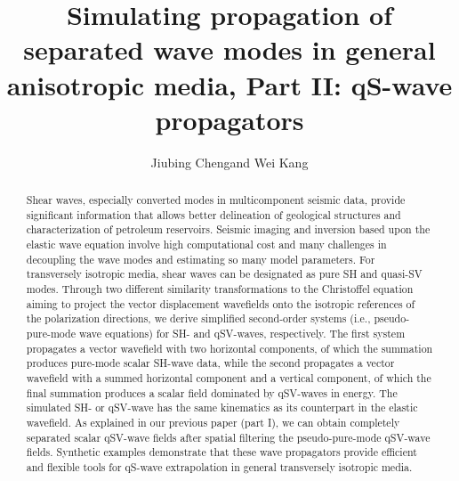 
\title{Simulating propagation of separated wave modes in general anisotropic media,
Part II: qS-wave propagators}

\author{Jiubing Cheng\footnotemark[1] and Wei Kang\footnotemark[2]}

\address{
\footnotemark[1] State Key Laboratory of Marine Geology,\\
Tongji University, Shanghai, China. E-mail: cjb1206@tongji.edu.cn\\
\footnotemark[2] Formerly Tongji University, Shanghai, China;\\
presently Schlumberger, Houston, Texas, USA. E-mail: wkang@slb.com\\
}


\maketitle

\newpage
%
\begin{abstract}
Shear waves, especially converted modes in multicomponent seismic data, 
provide significant information that allows better delineation of
geological structures and characterization of petroleum reservoirs.
Seismic imaging and inversion based upon the elastic wave equation involve high computational
cost and many challenges in decoupling the wave modes and estimating so many model parameters.
For transversely isotropic media, shear waves can be designated as pure SH and quasi-SV modes.
Through two different similarity transformations to the Christoffel equation aiming to project the
vector displacement wavefields onto the isotropic references of the polarization directions,
we derive simplified second-order systems (i.e., pseudo-pure-mode wave equations)
for SH- and qSV-waves, respectively.
The first system propagates a vector wavefield with two horizontal components, of which the summation
produces pure-mode scalar SH-wave data,
while the second propagates a vector wavefield with a summed horizontal component and a vertical component,
of which the final summation produces a scalar field dominated by qSV-waves in energy.
The simulated SH- or qSV-wave has the same kinematics as its counterpart in the elastic wavefield.
As explained in our previous paper (part I), we can obtain completely separated 
scalar qSV-wave fields after spatial filtering the pseudo-pure-mode qSV-wave fields.
Synthetic examples demonstrate that these wave propagators provide efficient and flexible tools 
for qS-wave extrapolation in general transversely isotropic media.
\end{abstract}

